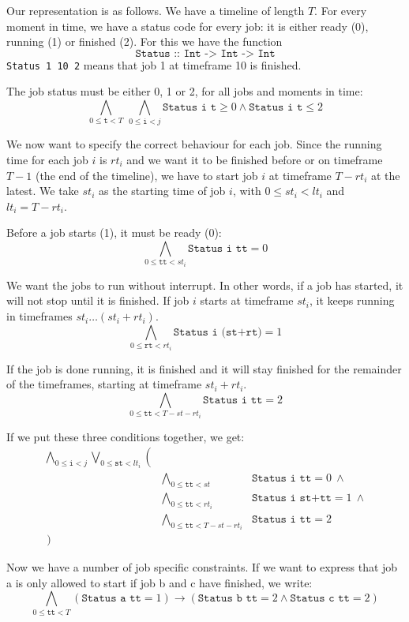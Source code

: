\documentclass[12pt]{article}
\begin{document}
Our representation is as follows.
We have a timeline of length $T$.
For every moment in time, we have a status code for every job: it is either ready (0), running (1) or finished (2). 
For this we have the function 
\[\texttt{Status :: Int -> Int -> Int}\]
\texttt{Status 1 10 2} means that job 1 at timeframe 10 is finished. 

The job status must be either 0, 1 or 2, for all jobs and moments in time:
\[ \bigwedge_{0 \le \texttt{t} < T} ~ \bigwedge_{0 \le \texttt{i} < j} \texttt{Status i t} \ge 0\wedge \texttt{Status i t} \le 2\]

We now want to specify the correct behaviour for each job. 
Since the running time for each job $i$ is $rt_i$ and we want it to be finished before or on timeframe $T-1$ (the end of the timeline), we have to start job $i$ at timeframe $T - rt_i$ at the latest.
We take $st_i$ as the starting time of job $i$, with $0 \le st_i < lt_i$ and $lt_i = T-rt_i$.

Before a job starts (1), it must be ready (0):
\[ \bigwedge_{0 \le \texttt{tt} < st_i} \texttt{Status i tt} = 0 \]

We want the jobs to run without interrupt.
In other words, if a job has started, it will not stop until it is finished. 
If job $i$ starts at timeframe $st_i$, it keeps running in timeframes $st_i \dots (st_i + rt_i)$.
\[ \bigwedge_{0 \le \texttt{rt} < rt_i} \texttt{Status i (st+rt)} = 1 \]

If the job is done running, it is finished and it will stay finished for the remainder of the timeframes, starting at timeframe $st_i + rt_i$.
\[ \bigwedge_{0 \le \texttt{tt} < T-st-rt_i} \texttt{Status i tt} = 2 \]

If we put these three conditions together, we get:
\[ \begin{array}{rll}
    \bigwedge_{0 \le \texttt{i} < j} \bigvee_{0 \le \texttt{st} < lt_i} \left( \right.&& \\
    & \bigwedge_{0 \le \texttt{tt} < st} & \texttt{Status i tt} = 0 ~ \wedge \\
    & \bigwedge_{0 \le \texttt{tt} < rt_i} & \texttt{Status i st+tt} = 1 ~ \wedge \\
    & \bigwedge_{0 \le \texttt{tt} < T-st-rt_i} & \texttt{Status i tt} = 2 \\
\left. \right)
\end{array} \]

Now we have a number of job specific constraints. 
If we want to express that job a is only allowed to start if job b and c have finished, we write: 
\[ \bigwedge_{0 \le \texttt{tt} < T} (\texttt{Status a tt} = 1) \rightarrow (\texttt{Status b tt} = 2 \wedge \texttt{Status c tt} = 2) \]
\end{document}
